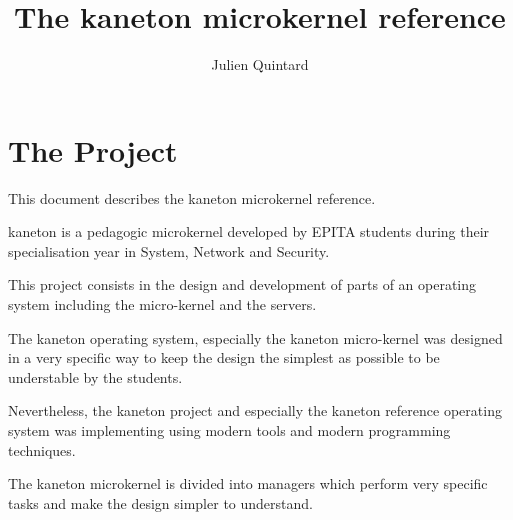 
%
%



%
%


%
%

\title{The kaneton microkernel reference}

%
%

\author{\small{Julien Quintard}}

%
%



%
%

\maketitle

%
%



%
%

\section{The Project}

This document describes the kaneton microkernel reference.

kaneton is a pedagogic microkernel developed by EPITA students during
their specialisation year in System, Network and Security.

This project consists in the design and development of parts of an
operating system including the micro-kernel and the servers.

The kaneton operating system, especially the kaneton micro-kernel was
designed in a very specific way to keep the design the simplest as possible
to be understable by the students.

Nevertheless, the kaneton project and especially the kaneton reference
operating system was implementing using modern tools and modern
programming techniques.

The kaneton microkernel is divided into managers which perform very
specific tasks and make the design simpler to understand.

